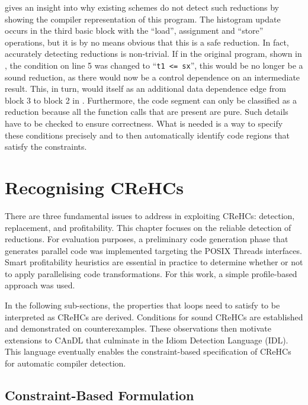      gives an insight into why existing schemes do not
    detect such reductions by showing the compiler representation of this 
    program.
    The histogram update occurs in the third basic block with the ``load'',
    assignment and ``store'' operations, but it is by no means obvious that this
    is a safe reduction.
    In fact, accurately detecting reductions is non-trivial.
    If in the original program, shown in , the
    condition on line 5 was changed to ``{\tt t1 <= sx}'', this would be no
    longer be a sound reduction, as there would now be a control dependence on
    an intermediate result.
    This, in turn, would itself as an additional data dependence edge from
    block 3 to block 2 in .
    Furthermore, the code segment can only be classified as a reduction because
    all the function calls that are present are pure.
    Such details have to be checked to ensure correctness.
    What is needed is a way to specify these conditions precisely and to then
    automatically identify code regions that satisfy the constraints.

\section{Recognising CReHCs}

    There are three fundamental issues to address in exploiting CReHCs:
    detection, replacement, and profitability.
    This chapter focuses on the reliable detection of reductions.
    For evaluation purposes, a preliminary code generation phase that generates
    parallel code was implemented targeting the POSIX Threads interfaces.
    Smart profitability heuristics are essential in practice to determine
    whether or not to apply parallelising code transformations.
    For this work, a simple profile-based approach was used.

    In the following sub-sections, the properties that loops need to satisfy
    to be interpreted as CReHCs are derived.
    Conditions for sound CReHCs are established and demonstrated on
    counterexamples.
    These observations then motivate extensions to CAnDL that culminate in the
    Idiom Detection Language (IDL).
    This language eventually enables the constraint-based specification of
    CReHCs for automatic compiler detection.

\subsection{Constraint-Based Formulation}

